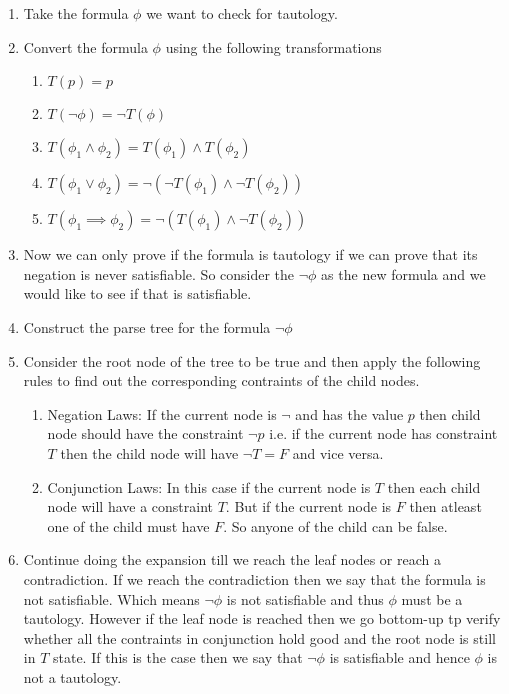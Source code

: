 \documentclass{article}
\begin{document}
\begin{enumerate}
\begin{answer}
  	\begin{enumerate}
  	  \item Take the formula $\phi$ we want to check for tautology.
  	  \item Convert the formula $\phi$ using the following transformations
  	  	\begin{enumerate}
  	  	  \item $T(p) = p$
  	  	  \item $T(\neg \phi) = \neg T(\phi)$
  	  	  \item $T(\phi_{1} \land \phi_{2}) = T(\phi_{1}) \land T(\phi_{2})$
  	  	  \item $T(\phi_{1} \lor \phi_{2}) = \neg(\neg T(\phi_{1}) \land \neg
  	  	  T(\phi_{2}))$
  	  	  \item $T(\phi_{1} \implies \phi_{2}) = \neg (T(\phi_{1}) \land \neg
  	  	  T(\phi_{2}))$
  	  	\end{enumerate}
  	  \item Now we can only prove if the formula is tautology if we can prove
  	  that its negation is never satisfiable. So consider the $\neg \phi$ as the
  	  new formula and we would like to see if that is satisfiable.
  	  \item Construct the parse tree for the formula $\neg \phi$
  	  \item Consider the root node of the tree to be true and then apply the
  	  following rules to find out the corresponding contraints of the child nodes.
  	  \begin{enumerate}
  	    \item Negation Laws: If the current node is $\neg$ and has the value $p$
  	    then child node should have the constraint $\neg p$ i.e. if the current
  	    node has constraint $T$ then the child node will have $\neg T = F$ and
  	    vice versa.
  	    \item Conjunction Laws: In this case if the current node is $T$ then
  	    each child node will have a constraint $T$. But if the current node is
  	    $F$ then atleast one of the child must have $F$. So anyone of the child
  	    can be false. 
  	  \end{enumerate}
  	  \item Continue doing the expansion till we reach the leaf nodes or reach a
  	  contradiction. If we reach the contradiction then we say that the formula
  	  is not satisfiable. Which means $\neg \phi$ is not satisfiable and thus
  	  $\phi$ must be a tautology. 
  	  However if the leaf node is reached then we go bottom-up tp verify whether
  	  all the contraints in conjunction hold good and the root node is still in
  	  $T$ state. If this is the case then we say that $\neg \phi$ is satisfiable
  	  and hence $\phi$ is not a tautology.
  	  

\end{enumerate}
\end{answer}
\end{enumerate}
\end{document}
